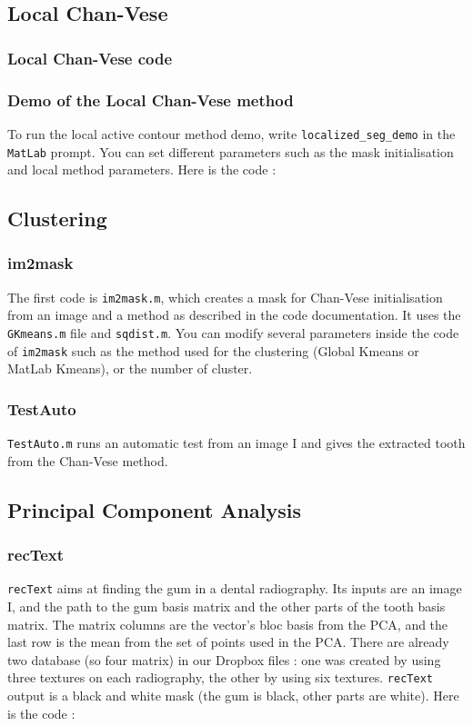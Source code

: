 \subsection{Local Chan-Vese}
\label{localcode}
\subsubsection*{Local Chan-Vese code}

\subsubsection*{Demo of the Local Chan-Vese method}
To run the local active contour method demo, write \texttt{localized\_seg\_demo} in the \texttt{MatLab} prompt. You can set different parameters such as the mask initialisation and local method parameters. Here is the code :


\subsection{Clustering}
\label{clusteringcode}
\subsubsection*{im2mask}
The first code is \texttt{im2mask.m}, which creates a mask for Chan-Vese initialisation from an image and a method as described in the code documentation. It uses the \texttt{GKmeans.m} file and \texttt{sqdist.m}. You can modify several parameters inside the code of \texttt{im2mask} such as the method used for the clustering (Global Kmeans or MatLab Kmeans), or the number of cluster.    

\subsubsection*{TestAuto}
\texttt{TestAuto.m} runs an automatic test from an image I and gives the extracted tooth from the Chan-Vese method. 


\subsection{Principal Component Analysis}
\label{pcacode}
\subsubsection*{recText}
\texttt{recText} aims at finding the gum in a dental radiography. Its inputs are an image I, and the path to the gum basis matrix and the other parts of the tooth basis matrix. The matrix columns are the vector's bloc basis from the PCA, and the last row is the mean from the set of points used in the PCA. There are already two database (so four matrix) in our Dropbox files : one was created by using three textures on each radiography, the other by using six textures. \texttt{recText} output is a black and white mask (the gum is black, other parts are white). Here is the code :

